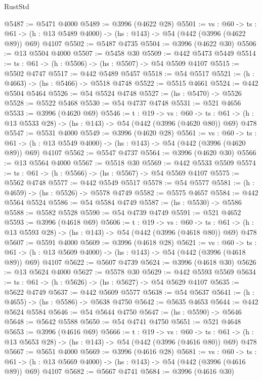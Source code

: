 \begin{lexlean}{RustStd}
\begin{coremodule}
@5487 := @5471 @4000
@5489 := @3996 (@4622 @28)
@5501 := {vs : @60} ->
  {ts : @61} -> (h : @13 @5489 @4000) -> (hs : @143) -> @54 (@442 (@3996 (@4622 @89)) @69) @4107
@5502 := @5487 @4735
@5504 := @3996 (@4622 @30)
@5506 := @13 @5504 @4000
@5507 := @5458 @30
@5509 := @442 @5473 @5449
@5514 := {ts : @61} -> (h : @5506) -> (hs : @5507) -> @54 @5509 @4107
@5515 := @5502 @4747
@5517 := @442 @5489 @5457
@5518 := @54 @5517
@5521 := (h : @4663) -> (hs : @5466) -> @5518 @4748
@5522 := @5515 @4661
@5524 := @442 @5504 @5464
@5526 := @54 @5524 @4748
@5527 := (hs : @5470) -> @5526
@5528 := @5522 @5468
@5530 := @54 @4737 @4748
@5531 := @521 @4656
@5533 := @3996 (@4620 @69)
@5546 := {t : @19} ->
  {vs : @60} ->
  {ts : @61} -> (h : @13 @5533 @28) -> (hs : @143) -> @54 (@442 (@3996 (@4620 @80)) @69) @478
@5547 := @5531 @4000
@5549 := @3996 (@4620 @28)
@5561 := {vs : @60} ->
  {ts : @61} -> (h : @13 @5549 @4000) -> (hs : @143) -> @54 (@442 (@3996 (@4620 @89)) @69) @4107
@5562 := @5547 @4737
@5564 := @3996 (@4620 @30)
@5566 := @13 @5564 @4000
@5567 := @5518 @30
@5569 := @442 @5533 @5509
@5574 := {ts : @61} -> (h : @5566) -> (hs : @5567) -> @54 @5569 @4107
@5575 := @5562 @4748
@5577 := @442 @5549 @5517
@5578 := @54 @5577
@5581 := (h : @4659) -> (hs : @5526) -> @5578 @4749
@5582 := @5575 @4657
@5584 := @442 @5564 @5524
@5586 := @54 @5584 @4749
@5587 := (hs : @5530) -> @5586
@5588 := @5582 @5528
@5590 := @54 @4739 @4749
@5591 := @521 @4652
@5593 := @3996 (@4618 @69)
@5606 := {t : @19} ->
  {vs : @60} ->
  {ts : @61} -> (h : @13 @5593 @28) -> (hs : @143) -> @54 (@442 (@3996 (@4618 @80)) @69) @478
@5607 := @5591 @4000
@5609 := @3996 (@4618 @28)
@5621 := {vs : @60} ->
  {ts : @61} -> (h : @13 @5609 @4000) -> (hs : @143) -> @54 (@442 (@3996 (@4618 @89)) @69) @4107
@5622 := @5607 @4739
@5624 := @3996 (@4618 @30)
@5626 := @13 @5624 @4000
@5627 := @5578 @30
@5629 := @442 @5593 @5569
@5634 := {ts : @61} -> (h : @5626) -> (hs : @5627) -> @54 @5629 @4107
@5635 := @5622 @4749
@5637 := @442 @5609 @5577
@5638 := @54 @5637
@5641 := (h : @4655) -> (hs : @5586) -> @5638 @4750
@5642 := @5635 @4653
@5644 := @442 @5624 @5584
@5646 := @54 @5644 @4750
@5647 := (hs : @5590) -> @5646
@5648 := @5642 @5588
@5650 := @54 @4741 @4750
@5651 := @521 @4648
@5653 := @3996 (@4616 @69)
@5666 := {t : @19} ->
  {vs : @60} ->
  {ts : @61} -> (h : @13 @5653 @28) -> (hs : @143) -> @54 (@442 (@3996 (@4616 @80)) @69) @478
@5667 := @5651 @4000
@5669 := @3996 (@4616 @28)
@5681 := {vs : @60} ->
  {ts : @61} -> (h : @13 @5669 @4000) -> (hs : @143) -> @54 (@442 (@3996 (@4616 @89)) @69) @4107
@5682 := @5667 @4741
@5684 := @3996 (@4616 @30)

\end{coremodule}
\end{lexlean}
